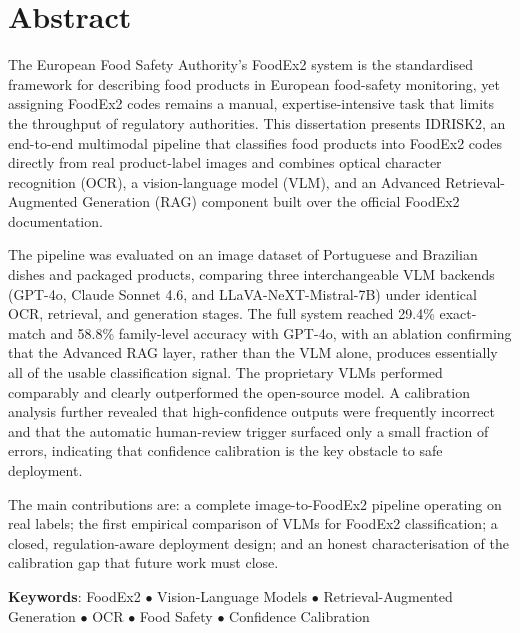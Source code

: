 \acresetall

\chapter*{Abstract}

The European Food Safety Authority's FoodEx2 system is the standardised framework for describing food products in European food-safety monitoring, yet assigning FoodEx2 codes remains a manual, expertise-intensive task that limits the throughput of regulatory authorities. This dissertation presents IDRISK2, an end-to-end multimodal pipeline that classifies food products into FoodEx2 codes directly from real product-label images and combines optical character recognition (OCR), a vision-language model (VLM), and an Advanced Retrieval-Augmented Generation (RAG) component built over the official FoodEx2 documentation.

The pipeline was evaluated on an image dataset of Portuguese and Brazilian dishes and packaged products, comparing three interchangeable VLM backends (GPT-4o, Claude Sonnet 4.6, and LLaVA-NeXT-Mistral-7B) under identical OCR, retrieval, and generation stages. The full system reached 29.4\% exact-match and 58.8\% family-level accuracy with GPT-4o, with an ablation confirming that the Advanced RAG layer, rather than the VLM alone, produces essentially all of the usable classification signal. The proprietary VLMs performed comparably and clearly outperformed the open-source model. A calibration analysis further revealed that high-confidence outputs were frequently incorrect and that the automatic human-review trigger surfaced only a small fraction of errors, indicating that confidence calibration is the key obstacle to safe deployment.

The main contributions are: a complete image-to-FoodEx2 pipeline operating on real labels; the first empirical comparison of VLMs for FoodEx2 classification; a closed, regulation-aware deployment design; and an honest characterisation of the calibration gap that future work must close.

\vspace{\fill}
\begin{flushleft}
{\Large \textbf{Keywords}:}
FoodEx2 \(\bullet\)
Vision-Language Models \(\bullet\)
Retrieval-Augmented Generation \(\bullet\)
OCR \(\bullet\)
Food Safety \(\bullet\)
Confidence Calibration
\end{flushleft}
\vspace*{24mm}

\acresetall
